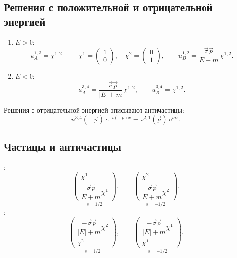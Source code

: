 \documentclass[../final.tex]{subfiles}
\begin{document}
\subsection*{Решения с положительной и отрицательной энергией}

\begin{enumerate}[label=\arabic*)]
    \item $E>0$:
    \begin{equation*}
        u_A^{1,2}=\chi^{1,2},
        \qquad
        \chi^1=
        \begin{pmatrix}
            1\\0
        \end{pmatrix},
        \quad
        \chi^2=
        \begin{pmatrix}
            0\\1
        \end{pmatrix},
        \qquad
        u_B^{1,2}=\frac{\vec\sigma\vec p}{E+m}\,\chi^{1,2}.
    \end{equation*}
    \item $E<0$:
    \begin{equation*}
        u_A^{3,4}=\frac{-\vec\sigma\vec p}{|E|+m}\,\chi^{1,2},
        \qquad
        u_B^{3,4}=\chi^{1,2}.
    \end{equation*}
\end{enumerate}
Решения с отрицательной энергией описывают античастицы:
\begin{equation*}
    u^{3,4}(-\vec p)\,e^{-i(-p)x}=v^{2,1}(\vec p)\,e^{ipx}.
\end{equation*}

\subsection*{Частицы и античастицы}

:
\begin{equation*}
    \underset{s=1/2}{
    \begin{pmatrix}
        \chi^1\\[0.3em]
        \dfrac{\vec\sigma\vec p}{E+m}\chi^1
    \end{pmatrix}},
    \qquad
    \underset{s=-1/2}{
    \begin{pmatrix}
        \chi^2\\[0.3em]
        \dfrac{\vec\sigma\vec p}{E+m}\chi^2
    \end{pmatrix}}.
\end{equation*}
:
\begin{equation*}
    \underset{s=1/2}{
    \begin{pmatrix}
        \dfrac{-\vec\sigma\vec p}{|E|+m}\chi^2\\[0.6em]
        \chi^2
    \end{pmatrix}},
    \qquad
    \underset{s=-1/2}{
    \begin{pmatrix}
        \dfrac{-\vec\sigma\vec p}{|E|+m}\chi^1\\[0.6em]
        \chi^1
    \end{pmatrix}}.
\end{equation*}
\end{document}
